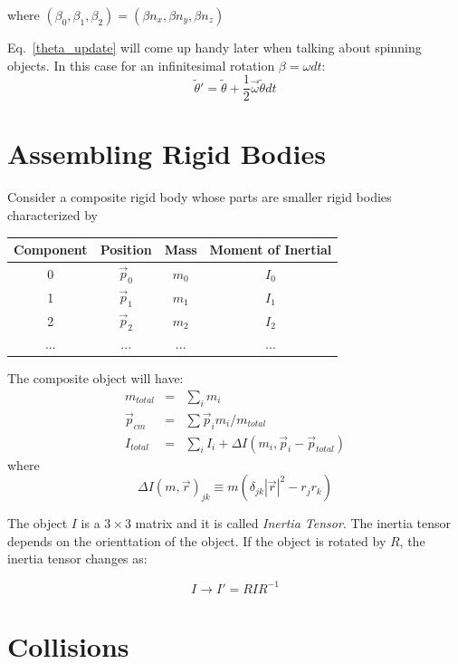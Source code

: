 \documentclass[12pt]{article}
\begin{document}
where $(\beta_0,\beta_1,\beta_2)=(\beta n_x,\beta n_y,\beta n_z)$

Eq.~\ref{theta_update} will come up handy later when talking about spinning objects. In this case for an infinitesimal rotation $\beta=\omega dt$:
\begin{equation}
\tilde \theta' = \tilde \theta + \frac{1}{2}\vec \omega \tilde \theta dt
\end{equation}

\section{Assembling Rigid Bodies}

Consider a composite rigid body whose parts are smaller rigid bodies characterized by
\begin{center}
\begin{tabular}{cccc} \hline
Component & Position & Mass & Moment of Inertial \\ \hline
0 & $\vec p_0$ & $m_0$ & $I_0$ \\ 
1 & $\vec p_1$ & $m_1$ & $I_1$ \\ 
2 & $\vec p_2$ & $m_2$ & $I_2$ \\ 
... & ... & ... & ... \\ \hline
\end{tabular}
\end{center}

The composite object will have:
\begin{eqnarray}
m_{total} &=& \sum_i m_i \\
\vec p_{cm} &=& \sum \vec p_i m_i/m_{total} \\
I_{total} &=& \sum_i I_i + \Delta I(m_i, \vec p_i - \vec p_{total})
\end{eqnarray}
where
\begin{equation}
\Delta I(m, \vec r)_{jk} \equiv m (\delta_{jk} |\vec r|^2 - r_j r_k)
\end{equation}

The object $I$ is a $3\times 3$ matrix and it is called {\it Inertia Tensor}. The inertia tensor depends on the orienttation of the object. If the object is rotated by $R$, the inertia tensor changes as:

\begin{equation}
I \rightarrow I' = R I R^{-1}
\end{equation}

\section{Collisions}
\end{document}
